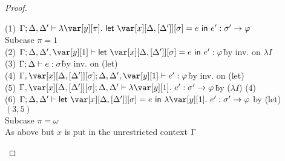 




\FullLazinessTheorem

\begin{proof}~

\begin{tabbing}
    (1) $\G; \D,\D' \vdash \lambda \y[\pi].~\llet{\xD = e}{e'} : \s' \to \vp$\\
    Subcase $\pi = 1$\\
    (2) $\G; \D,\D',\y[1] \vdash \llet{\xD = e}{e'} : \vp$\`by inv. on $\lambda I$\\
    (3) $\Gamma; \Delta \vdash e : \sigma$\` by inv. on (let)\\
    (4) $\G, \xD; \D, \D', \y[1] \vdash e' : \vp$\`by inv. on (let)\\
    (5) $\G, \xD; \D, \D' \vdash \lambda \y[1].~e' : \s' \to \vp$\`by ($\lambda I$) (4)\\
    (6) $\G; \D,\D' \vdash \llet{\xD = e}{\lambda \y[1].~e'} : \s' \to \vp$ by (let) $(3,5)$\\
    Subcase $\pi = \omega$\\
    As above but $x$ is put in the unrestricted context $\Gamma$
\end{tabbing}
\end{proof}


\LocalTransformationsTheorem

